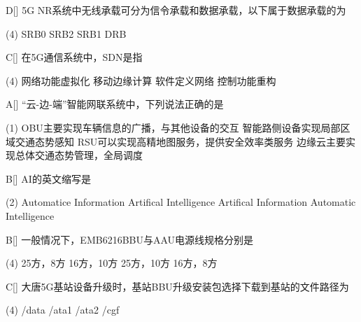 \begin{choice}{D}[]
    5G NR系统中无线承载可分为信令承载和数据承载，以下属于数据承载的为
    \begin{tasks}(4)
        \task SRB0
        \task SRB2
        \task SRB1
        \task DRB
    \end{tasks}
\end{choice}

\begin{choice}{C}[]
    在5G通信系统中，SDN是指
    \begin{tasks}(4)
        \task 网络功能虚拟化
        \task 移动边缘计算
        \task 软件定义网络
        \task 控制功能重构
    \end{tasks}
\end{choice}




\begin{choice}{A}[]
    “云-边-端”智能网联系统中，下列说法正确的是
    \begin{tasks}(1)
        \task OBU主要实现车辆信息的广播，与其他设备的交互
        \task 智能路侧设备实现局部区域交通态势感知
        \task RSU可以实现高精地图服务，提供安全效率类服务
        \task 边缘云主要实现总体交通态势管理，全局调度
    \end{tasks}
\end{choice}


\begin{choice}{B}[]
    AI的英文缩写是
    \begin{tasks}(2)
        \task Automatice Information
        \task Artifical Intelligence
        \task Artifical Information
        \task Automatic Intelligence
    \end{tasks}
\end{choice}


\begin{choice}{B}[]
    一般情况下，EMB6216BBU与AAU电源线规格分别是
    \begin{tasks}(4)
        \task 25方，8方
        \task 16方，10方
        \task 25方，10方
        \task 16方，8方
    \end{tasks}
\end{choice}


\begin{choice}{C}[]
    大唐5G基站设备升级时，基站BBU升级安装包选择下载到基站的文件路径为
    \begin{tasks}(4)
        \task /data
        \task /ata1
        \task /ata2
        \task /cgf
    \end{tasks}
\end{choice}

